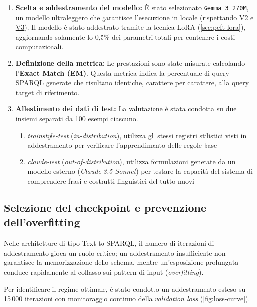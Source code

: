 \documentclass[12pt,a4paper,openright,twoside]{book}
\begin{document}
\begin{enumerate}
    \item \textbf{Scelta e addestramento del modello:} È stato selezionato
          \texttt{Gemma 3 270M}, un modello ultraleggero che garantisce l'esecuzione
          in locale (rispettando \hyperref[vinc:V2]{V2} e \hyperref[vinc:V3]{V3}). Il modello è
          stato addestrato tramite la tecnica LoRA (\cref{sec:peft-lora}), aggiornando
          solamente lo 0,5\% dei parametri totali per contenere i costi
          computazionali.

    \item \textbf{Definizione della metrica:} Le prestazioni sono state misurate
          calcolando l'\textbf{Exact Match (EM)}. Questa metrica indica la percentuale
          di query SPARQL generate che risultano identiche, carattere per carattere,
          alla query target di riferimento.

    \item \textbf{Allestimento dei dati di test:} La valutazione è stata
          condotta su due insiemi separati da 100 esempi ciascuno.
          \begin{enumerate}
              \item \emph{trainstyle-test} (\textit{in-distribution}), utilizza gli
                    stessi registri stilistici visti in addestramento per verificare
                    l'apprendimento delle regole base
              \item \emph{claude-test}
                    (\textit{out-of-distribution}), utilizza formulazioni generate da un modello
                    esterno (\textit{Claude 3.5 Sonnet}) per testare la capacità del sistema di
                    comprendere frasi e costrutti linguistici del tutto nuovi
          \end{enumerate}
\end{enumerate}

\subsection{Selezione del checkpoint e prevenzione dell'overfitting}

Nelle architetture di tipo Text-to-SPARQL, il numero di iterazioni di
addestramento gioca un ruolo critico; un addestramento insufficiente non
garantisce la memorizzazione dello schema, mentre un'esposizione prolungata
conduce rapidamente al collasso sui pattern di input (\textit{overfitting}).

Per identificare il regime ottimale, è stato condotto un addestramento esteso su
15\,000 iterazioni con monitoraggio continuo della \textit{validation loss}
(\cref{fig:loss-curve}).
\end{document}
